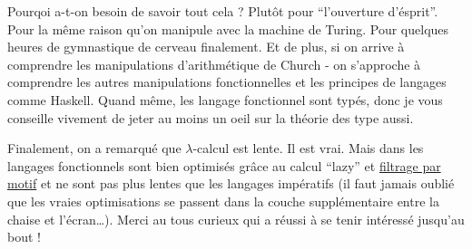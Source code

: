 Pourqoi a-t-on besoin de savoir tout cela ? Plutôt pour ``l'ouverture d'ésprit''. Pour la même raison qu'on manipule avec la machine de Turing. Pour quelques heures de gymnastique de cerveau finalement. Et de plus, si on arrive à comprendre les manipulations d'arithmétique de Church - on s'approche à comprendre les autres manipulations fonctionnelles et les principes de langages comme Haskell.
Quand même, les langage fonctionnel sont typés, donc je vous conseille vivement de jeter au moins un oeil sur la théorie des type aussi.

Finalement, on a remarqué que $\lambda$-calcul est lente.
Il est vrai. Mais dans les langages fonctionnels sont bien optimisés grâce au calcul ``lazy'' et \href{https://fr.wikipedia.org/wiki/Filtrage_par_motif}{filtrage par motif} et ne sont pas plus lentes que les langages impératifs (il faut jamais oublié que les vraies optimisations se passent dans la couche supplémentaire entre la chaise et l'écran\ldots). Merci au tous curieux qui a réussi à se tenir intéressé jusqu'au bout !